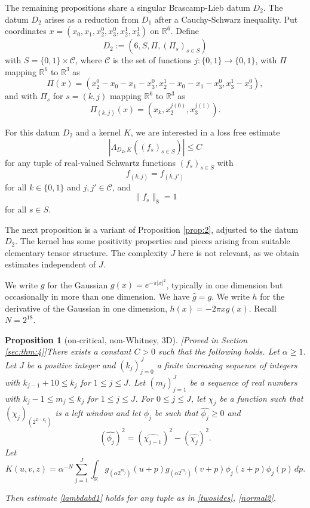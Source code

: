 \documentclass[12pt,reqno]{amsart}
\theoremstyle{plain}
\newtheorem{proposition}[theorem]{Proposition}
\theoremstyle{definition}
\numberwithin{equation}{section}
\newcommand{\R}{{\mathbb R}}
\def\wh{\widehat}
\begin{document}
The remaining propositions share a  singular  Brascamp-Lieb datum $D_2$.
The datum $D_2$ arises as a reduction from $D_1$ after a  Cauchy-Schwarz inequality.
Put coordinates  $x=(x_0,x_1,x_{2}^0,x_{3}^0,x_{2}^1,x_{3}^1)$ on $\R^6$.
Define 
\begin{equation}\label{defd2}
    D_2:=(6,S, \Pi,(\Pi_s)_{s\in S})
\end{equation} with 
$S=\{0,1\}\times {\mathcal C}$,  where
${\mathcal C}$ is the set of functions $j:\{0,1\}\to \{0,1\}$,  with $\Pi$ mapping $\R^6$ to $\R^3$ as
\[\Pi(x) = (x_2^0-x_0-x_1-x_3^0, x_2^1-x_0-x_1-x_3^0, x_3^1-x_3^0),\]
and with $\Pi_s$ for $s=(k,j)$ mapping $\R^6$ to $\R^3$ as
\[\Pi_{(k,j)}(x)= (x_k, x_2^{j(0)}, x_3^{j(1)}). \]

For this datum $D_2$ and a kernel $K$, we are interested in a    loss free estimate 
\begin{equation}\label{lambdabd1}
|\Lambda_{D_2,K} ((f_s)_{s\in S})|\le C 
\end{equation}
for any tuple of real-valued Schwartz functions $(f_s)_{s\in S}$ with 
\begin{equation}\label{twosides}
f_{(k,j)}=f_{(k,j')} 
\end{equation}
for all $k\in\{0,1\}$ and $j,j'\in \mathcal{C}$, and
\begin{equation}\label{normal2}
\|f_{s}\|_{8}=1
\end{equation}
for all $s\in S$.

The next proposition is a variant of Proposition \ref{prop:2},
adjusted to the datum $D_2$. The kernel has some positivity properties and pieces arising from suitable elementary tensor structure. The complexity $J$ here is not relevant, as we obtain estimates independent of $J$.

We write $g$ for the Gaussian 
$g(x)=e^{-\pi |x|^2}$,
typically in one dimension but occasionally in more than one dimension.
We have $\widehat{g}=g$. We write $h$ for the derivative of the Gaussian in one dimension, $h(x)=-2\pi x g(x)$. Recall $N=2^{18}$.

 \begin{proposition}[on-critical, non-Whitney, 3D][Proved in Section \ref{sec:thm:4}]\label{thm:4}
There exists a constant $C>0$ such that the following holds.
Let $\alpha\ge 1$. Let $J$ be a positive integer and $(k_j)_{j=0}^J$   a   finite increasing sequence of integers with $k_{j-1}+10 \leq k_{j}$ for $1\le j \leq J$. Let $(m_j)_{j=1}^J$ be a sequence of real numbers with
$k_j-1\le m_j\le k_j$ for $1\le j\le J$.  For $0\le j\le J$, let $\chi_j$
be a function such that ${(\chi_j)_{(2^{2-k_j})}}$ is a left window
and let $\phi_{j}$ be such that $\wh{\phi_j} \geq 0$ and
$$ (\widehat{\phi_{j}})^2=(\widehat{\chi_{j-1}})^2-
(\widehat{\chi_{j}})^2.$$
Let
\begin{equation*}
K(u,v,z)=\alpha^{-N} \sum_{j=1}^J \int_{\R}g_{(\alpha 2^{m_j})}(u+p) g_{(\alpha 2^{m_j})}(v+p)
 {\phi}_{j}(z+p){\phi}_{j}(p)  \, dp.
\end{equation*}

Then estimate \eqref{lambdabd1} holds for any tuple as in \eqref{twosides}, \eqref{normal2}.
\end{proposition}
 
\end{document}

